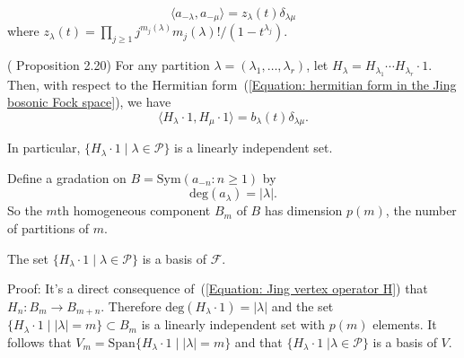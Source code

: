\begin{equation}\label{Equation: hermitian form in the Jing bosonic Fock space}
    \langle a_{-\lambda},a_{-\mu} \rangle=z_{\lambda}(t)\delta_{\lambda\mu}
\end{equation}
where $z_{\lambda}(t)= \prod_{j\geq1}j^{m_j(\lambda)}m_j(\lambda)!/(1-t^{\lambda_j})$. 
\begin{dang}
    \begin{theorem}(\cite{jing1991vertex} Proposition 2.20)\label{Theorem: orthogonality of H_lambda1}
        For any partition $\lambda=(\lambda_1,\dots,\lambda_r)$, let $H_\lambda = H_{\lambda_1}\cdots H_{\lambda_r}\cdot1$. Then, with respect to the Hermitian form~(\ref{Equation: hermitian form in the Jing bosonic Fock space}), we have
        \begin{equation}
            \langle H_\lambda\cdot1,H_\mu\cdot1\rangle = b_\lambda(t)\delta_{\lambda\mu}.
        \end{equation}
    \end{theorem}
\end{dang}
In particular, $\{H_\lambda\cdot1\;|\;\lambda\in\mathcal{P}\}$ is a linearly independent set.
\begin{dang}
    \begin{definition}
        Define a gradation on $B=\text{Sym}(a_{-n}:n\geq1)$ by 
        \begin{equation}
            \text{deg}(a_\lambda) = |\lambda|.
        \end{equation}
        So the $m$th homogeneous component $B_m$ of $B$ has dimension $p(m)$, the number of partitions of $m$.
    \end{definition}
\end{dang}
\begin{dang}
    \begin{theorem}\label{Theorem: H_lambda is a basis of F}
        The set $\{H_\lambda\cdot1\;|\;\lambda\in\mathcal{P}\}$ is a basis of $\mathcal{F}$.
    \end{theorem}
\end{dang}
Proof: It's a direct consequence of~(\ref{Equation: Jing vertex operator H}) that $H_n: B_m\rightarrow B_{m+n}$. Therefore $\text{deg}(H_\lambda\cdot 1)=|\lambda|$ and the set $\{H_\lambda\cdot1\;|\;|\lambda|=m\}\subset B_m$ is a linearly independent set with $p(m)$ elements. It follows that $V_m=\text{Span}\{H_\lambda\cdot1\;|\;|\lambda|=m\}$ and that $\{H_\lambda\cdot1\;|\lambda\in\mathcal{P}\}$ is a basis of $V$.\par


